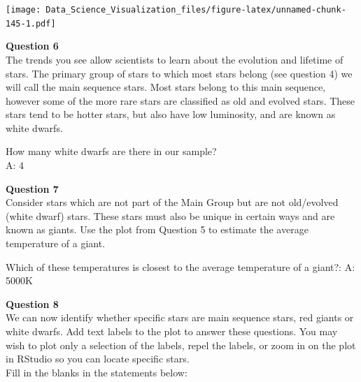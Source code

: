 \documentclass[
]{article}
\newenvironment{Shaded}{\begin{snugshade}}{\end{snugshade}}
\newcommand{\DataTypeTok}[1]{\textcolor[rgb]{0.13,0.29,0.53}{#1}}
\newcommand{\KeywordTok}[1]{\textcolor[rgb]{0.13,0.29,0.53}{\textbf{#1}}}
\newcommand{\NormalTok}[1]{#1}
\newcommand{\OperatorTok}[1]{\textcolor[rgb]{0.81,0.36,0.00}{\textbf{#1}}}
\newcommand{\StringTok}[1]{\textcolor[rgb]{0.31,0.60,0.02}{#1}}
\begin{document}
\begin{Shaded}
\end{Shaded}

\texttt{[image: Data\_Science\_Visualization\_files/figure-latex/unnamed-chunk-145-1.pdf]}

\textbf{Question 6}\\
The trends you see allow scientists to learn about the evolution and
lifetime of stars. The primary group of stars to which most stars belong
(see question 4) we will call the main sequence stars. Most stars belong
to this main sequence, however some of the more rare stars are
classified as old and evolved stars. These stars tend to be hotter
stars, but also have low luminosity, and are known as white dwarfs.

How many white dwarfs are there in our sample?\\
A: 4

\textbf{Question 7}\\
Consider stars which are not part of the Main Group but are not
old/evolved (white dwarf) stars. These stars must also be unique in
certain ways and are known as giants. Use the plot from Question 5 to
estimate the average temperature of a giant.

Which of these temperatures is closest to the average temperature of a
giant?: A: 5000K

\textbf{Question 8}\\
We can now identify whether specific stars are main sequence stars, red
giants or white dwarfs. Add text labels to the plot to answer these
questions. You may wish to plot only a selection of the labels, repel
the labels, or zoom in on the plot in RStudio so you can locate specific
stars.\\
Fill in the blanks in the statements below:
\end{document}
